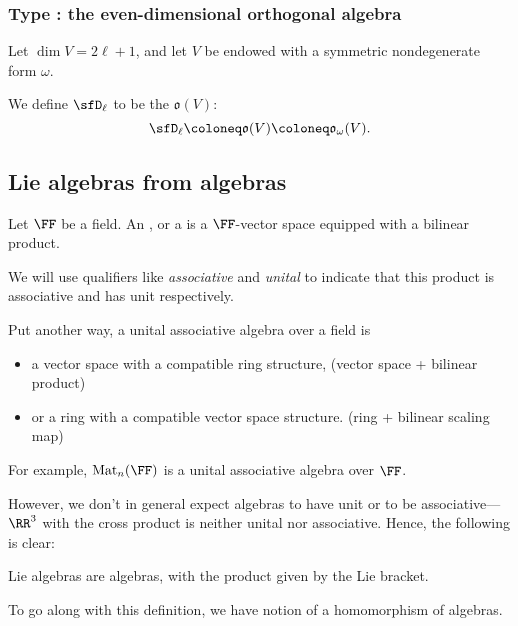 \documentclass{article}
\DeclareMathOperator{\Mat}{Mat}
\newcommand*\oalg{\ensuremath{\mathfrak{o}}}
\begin{document}
\subsubsection{Type \sfD: the even-dimensional orthogonal algebra}

\begin{definition}
    Let $\dim V = 2\ell+1$, and let $V$ be endowed with a symmetric nondegenerate form $\omega$.

    We define $\sfD_\ell$ to be the  $\oalg(V)$:
    \[
        \sfD_\ell
        \coloneq
        \oalg(V)
        \coloneq
        \oalg_\omega(V).
    \]
\end{definition}

\subsection{Lie algebras from algebras}

\begin{definition}
    Let $\FF$ be a field.
    An , or a  is a $\FF$-vector space equipped with a bilinear product.

    We will use qualifiers like \textit{associative} and \textit{unital} to indicate that this product is associative and has unit respectively.
\end{definition}

Put another way, a unital associative algebra over a field is 
\begin{itemize}
    \item 
        a vector space with a compatible ring structure, (vector space + bilinear product)
    \item 
        or a ring with a compatible vector space structure.
        (ring + bilinear scaling map)
\end{itemize}
For example, $\Mat_n(\FF)$ is a unital associative algebra over $\FF$.

However, we don't in general expect algebras to have unit or to be associative--- $\RR^3$ with the cross product is neither unital nor associative.
Hence, the following is clear:

\begin{proposition}
    Lie algebras are algebras, with the product given by the Lie bracket.
\end{proposition}

To go along with this definition, we have notion of a homomorphism of algebras.
\end{document}
